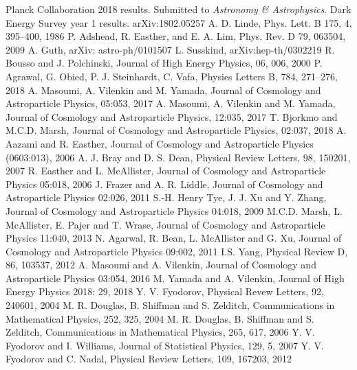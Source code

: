 \documentclass[12pt]{article}
\begin{document}
\begin{thebibliography}{99}
 Planck Collaboration 2018 results. Submitted to \emph{Astronomy \& Astrophysics}.
 Dark Energy Survey year 1 results. arXiv:1802.05257
 A. D. Linde, Phys. Lett. B 175, 4, 395--400, 1986
 P. Adshead, R. Easther, and E. A. Lim, Phys. Rev. D 79, 063504, 2009
 A. Guth, arXiv: astro-ph/0101507
 L. Susskind, arXiv:hep-th/0302219
 R. Bousso and J. Polchinski, Journal of High Energy Physics, 06, 006, 2000
 P. Agrawal, G. Obied, P. J. Steinhardt, C. Vafa, Physics Letters B, 784, 271--276, 2018
 A. Masoumi, A. Vilenkin and M. Yamada, Journal of Cosmology and Astroparticle Physics, 05:053, 2017
 A. Masoumi, A. Vilenkin and M. Yamada, Journal of Cosmology and Astroparticle Physics, 12:035, 2017
 T. Bjorkmo and M.C.D. Marsh, Journal of Cosmology and Astroparticle Physics, 02:037, 2018
 A. Aazami and R. Easther, Journal of Cosmology and Astroparticle Physics (0603:013), 2006
 A. J. Bray and D. S. Dean, Physical Review Letters, 98, 150201, 2007
 R. Easther and L. McAllister, Journal of Cosmology and Astroparticle Physics 05:018, 2006
 J. Frazer and A. R. Liddle, Journal of Cosmology and Astroparticle Physics 02:026, 2011
 S.-H. Henry Tye, J. J. Xu and Y. Zhang, Journal of Cosmology and Astroparticle Physics 04:018, 2009
 M.C.D. Marsh, L. McAllister, E. Pajer and T. Wrase, Journal of Cosmology and Astroparticle Physics 11:040, 2013
 N. Agarwal, R. Bean, L. McAllister and G. Xu, Journal of Cosmology and Astroparticle Physics 09:002, 2011
 I.S. Yang, Physical Review D, 86, 103537, 2012
 A. Masoumi and A. Vilenkin, Journal of Cosmology and Astroparticle Physics 03:054, 2016
 M. Yamada and A. Vilenkin, Journal of High Energy Physics 2018: 29, 2018
 Y. V. Fyodorov, Physical Revew Letters, 92, 240601, 2004
 M. R. Douglas, B. Shiffman and S. Zelditch, Communications in Mathematical Physics, 252, 325, 2004
 M. R. Douglas, B. Shiffman and S. Zelditch, Communications in Mathematical Physics, 265, 617, 2006 
 Y. V. Fyodorov and I. Williams, Journal of Statistical Physics, 129, 5, 2007
 Y. V. Fyodorov and C. Nadal, Physical Review Letters, 109, 167203, 2012

\end{thebibliography}
\end{document}
